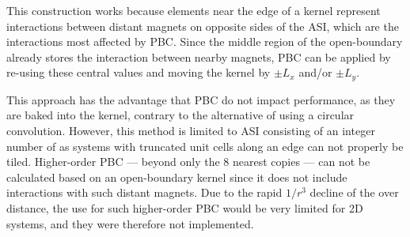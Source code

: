 
This construction works because elements near the edge of a kernel represent interactions between distant magnets on opposite sides of the ASI, which are the interactions most affected by PBC.
Since the middle region of the open-boundary  already stores the interaction between nearby magnets, PBC can be applied by re-using these central values and moving the kernel by $\pm L_x$ and/or $\pm L_y$. \\\par

This approach has the advantage that PBC do not impact performance, as they are baked into the kernel, contrary to the alternative of using a circular convolution.
However, this method is limited to ASI consisting of an integer number of  as systems with truncated unit cells along an edge can not properly be tiled.
Higher-order PBC --- beyond only the 8 nearest copies --- can not be calculated based on an open-boundary kernel since it does not include interactions with such distant magnets.
Due to the rapid $1/r^3$ decline of the  over distance, the use for such higher-order PBC would be very limited for 2D systems, and they were therefore not implemented.

